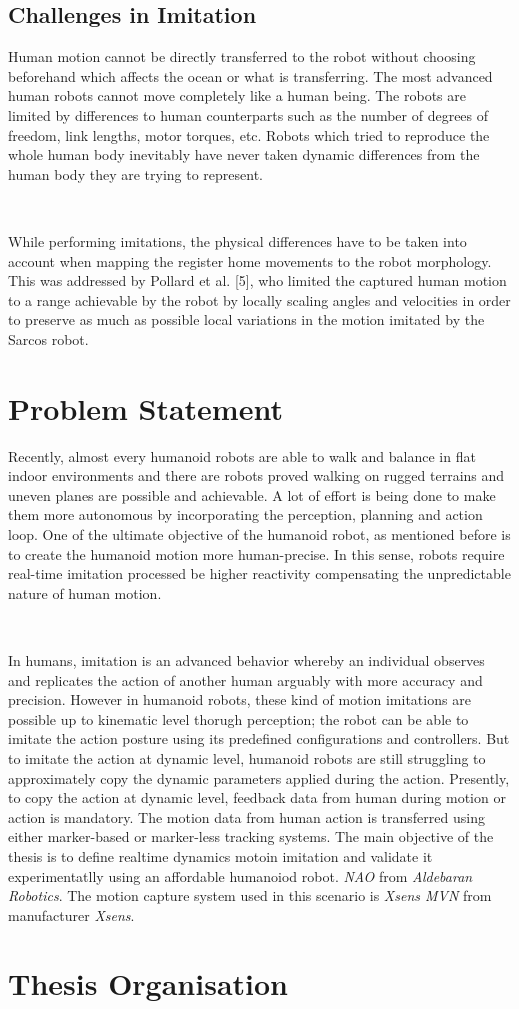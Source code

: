 \subsection*{Challenges in Imitation}

Human motion cannot be directly transferred to the robot without choosing beforehand which affects the ocean or what
is transferring. The most advanced human robots cannot move completely like a human being. The robots are limited 
by differences to human counterparts such as the number of degrees of freedom, link lengths, motor torques, etc. 
Robots which tried to reproduce the whole human body inevitably have never taken dynamic differences from the human 
body they are trying to represent.

~

While performing imitations, the physical differences have to be taken into account when mapping the register home 
movements to the robot morphology. This was addressed by Pollard et al. [5], who limited the captured human motion 
to a range achievable by the robot by locally scaling angles and velocities in order to preserve as much as possible 
local variations in the motion imitated by the Sarcos robot.


\section{Problem Statement}

Recently, almost every humanoid robots are able to walk and balance in flat indoor environments and there are robots 
proved walking on rugged terrains and uneven planes are possible and achievable. A lot of effort is being done to make
them more autonomous by incorporating the perception, planning and action loop. One of the ultimate objective of the 
humanoid robot, as mentioned before is to create the humanoid motion more human-precise. In this sense, robots require 
real-time imitation processed be higher reactivity compensating the unpredictable nature of human motion.

~

In humans, imitation is an advanced behavior whereby an individual observes and replicates the action of another 
human arguably with more accuracy and precision. However in humanoid robots, these kind of motion imitations are possible
up to kinematic level thorugh perception; the robot can be able to imitate the action posture using its predefined 
configurations and controllers. But to imitate the action at dynamic level, humanoid robots are still struggling to 
approximately copy the dynamic parameters applied during the action. Presently, to copy the action at dynamic level, 
feedback data from human during motion or action is mandatory. The motion data from human action is transferred using 
either marker-based or marker-less tracking systems. The main objective of the thesis is to define realtime dynamics 
motoin imitation and validate it experimentatlly using an affordable humanoiod robot. \textit{NAO} from \textit{Aldebaran
Robotics}. The motion capture system used in this scenario is \textit{Xsens MVN} from manufacturer \textit{Xsens}.

\section{Thesis Organisation}
